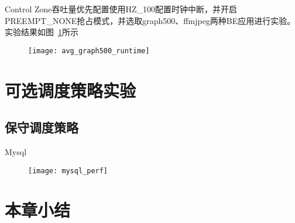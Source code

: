 
Control Zone吞吐量优先配置使用HZ\_100配置时钟中断，并开启PREEMPT\_NONE抢占模式，并选取graph500、ffmjpeg两种BE应用进行实验。实验结果如图~\ref{fig:avg_graph500_runtime}所示

\begin{figure}[!htbp]
    \centering
    \texttt{[image: avg\_graph500\_runtime]}
    \label{fig:avg_graph500_runtime}
\end{figure}

\section{可选调度策略实验}

\subsection{保守调度策略}


Mysql

\begin{figure}[!htbp]
    \centering
    \texttt{[image: mysql\_perf]}
    \label{fig:mysql_perf}
\end{figure}



\section{本章小结}